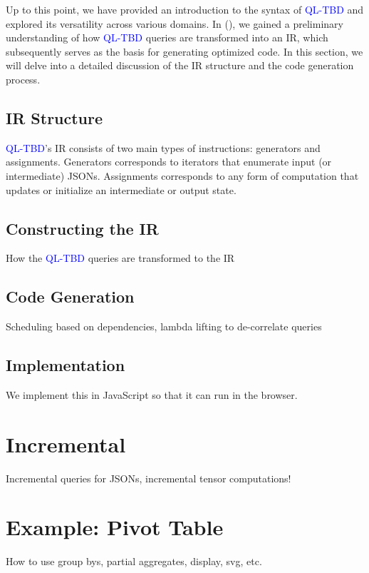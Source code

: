 \documentclass[runningheads]{llncs}
\newcommand{\lang}{\textcolor{blue}{QL-TBD}}
\begin{document}
Up to this point, we have provided an introduction to the syntax of
\lang{} and explored its versatility across various domains.
In  (), we gained a preliminary understanding
of how \lang{} queries are transformed into an IR, which subsequently serves
as the basis for generating optimized code.
In this section, we will delve into a detailed discussion of the IR structure
and the code generation process.

\subsection{IR Structure}

\lang{}'s IR consists of two main types of instructions: generators and assignments.
Generators corresponds to iterators that enumerate input (or intermediate) JSONs.
Assignments corresponds to any form of computation that updates or initialize an
intermediate or output state.

\subsection{Constructing the IR}
How the \lang{} queries are transformed to the IR

\subsection{Code Generation}
Scheduling based on dependencies, lambda lifting to de-correlate queries

\subsection{Implementation}
We implement this in JavaScript so that it can run in the browser.

\section{Incremental}
Incremental queries for JSONs, incremental tensor computations!



\section{Example: Pivot Table}\label{sec:case_study}
How to use group bys, partial aggregates, display, svg, etc.
\end{document}
